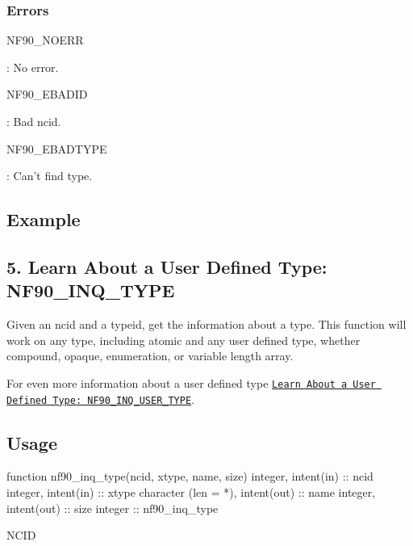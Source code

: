 \subsubsection*{Errors}

{\ttfamily N\+F90\+\_\+\+N\+O\+E\+RR}

\+: No error.

{\ttfamily N\+F90\+\_\+\+E\+B\+A\+D\+ID}

\+: Bad ncid.

{\ttfamily N\+F90\+\_\+\+E\+B\+A\+D\+T\+Y\+PE}

\+: Can’t find type.

\subsection*{Example}\hypertarget{f90-user-defined-data-types_f90-learn-about-a-user-defined-type-nf90_inq_type}{}\subsection{5. Learn About a User Defined Type\+: N\+F90\+\_\+\+I\+N\+Q\+\_\+\+T\+Y\+P\+E }\label{f90-user-defined-data-types_f90-learn-about-a-user-defined-type-nf90_inq_type}
Given an ncid and a typeid, get the information about a type. This function will work on any type, including atomic and any user defined type, whether compound, opaque, enumeration, or variable length array.

For even more information about a user defined type \href{#NF90_005fINQ_005fUSER_005fTYPE}{\tt Learn About a User Defined Type\+: N\+F90\+\_\+\+I\+N\+Q\+\_\+\+U\+S\+E\+R\+\_\+\+T\+Y\+PE}.

\subsection*{Usage}


\begin{DoxyCode}
\textcolor{keyword}{function }nf90\_inq\_type(ncid, xtype, name, size)
  \textcolor{keywordtype}{integer}, \textcolor{keywordtype}{intent(in)} :: ncid
  \textcolor{keywordtype}{integer}, \textcolor{keywordtype}{intent(in)} :: xtype
  \textcolor{keywordtype}{character (len = *)}, \textcolor{keywordtype}{intent(out)} :: name
  \textcolor{keywordtype}{integer}, \textcolor{keywordtype}{intent(out)} :: size
  \textcolor{keywordtype}{integer} :: nf90\_inq\_type
\end{DoxyCode}


{\ttfamily N\+C\+ID}

